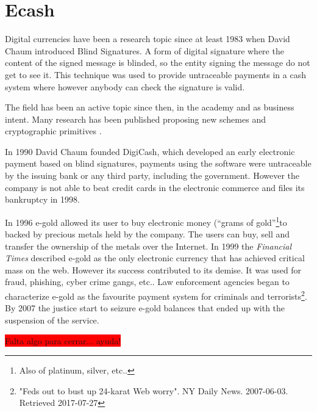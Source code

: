 \section{Ecash}
Digital currencies have been a research topic since at least 1983 when David
  Chaum\cite{chaum1983blind} introduced Blind Signatures. A form of digital
  signature where the content of the signed message is blinded, so the entity
  signing the message do not get to see it. This technique was used to provide
  untraceable payments in a cash system where however anybody can check the
  signature is valid.

The field has been an active topic since then, in the academy and as business
  intent. Many research has been published proposing new schemes and
  cryptographic primitives\cite{okamoto1991universal}\cite{chaum1992achieving}
  \cite{boly1994esprit}\cite{anderson1996netcard}\cite{lysyanskaya1998group}.

In 1990 David Chaum founded DigiCash, which developed an early electronic
  payment based on blind signatures, payments using the software were
  untraceable by the issuing bank or any third party, including the government.
However the company is not able to beat credit cards in the electronic
  commerce and files its bankruptcy in 1998.

In 1996 e-gold allowed its user to buy electronic money (``grams of
  gold''\footnote{Also of platinum, silver, etc..}to backed by precious
  metals held by the company.\cite{hughes2007developments}
The users can buy, sell and transfer the ownership of the metals over the
  Internet. In 1999 the \textit{Financial Times} described e-gold as the only
  electronic currency that has achieved critical mass on the web.
However its success contributed to its demise. It was used for fraud, phishing,
  cyber crime gangs, etc.. Law enforcement agencies began to characterize
  e-gold as the favourite payment system for criminals and terrorists\footnote{
  "Feds out to bust up 24-karat Web worry". NY Daily News. 2007-06-03. Retrieved
  2017-07-27}. By 2007 the justice start to seizure e-gold balances that ended up
  with the suspension of the service.

  \colorbox{red}{Falta algo para cerrar... ayuda!}


